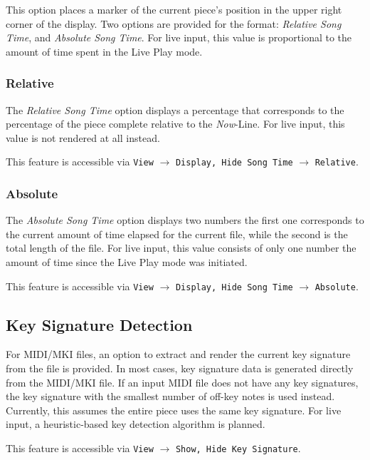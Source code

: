 \documentclass[english]{article}
\providecommand{\mi}[1]{\texttt{#1}}
\begin{document}
This option places a marker of the current piece's position in the upper right corner of the display.
Two options are provided for the format: \textit{Relative Song Time}, and \textit{Absolute Song Time}.
For live input, this value is proportional to the amount of time spent in the Live Play mode.

\subsubsection{Relative}

The \textit{Relative Song Time} option displays a percentage that corresponds to the percentage of the piece
complete relative to the \textit{Now}-Line. For live input, this value is not rendered at all instead.

This feature is accessible via 
\mi{View} $\rightarrow$ \mi{{Display, Hide} Song Time} $\rightarrow$ \mi{Relative}.

\subsubsection{Absolute}

The \textit{Absolute Song Time} option displays two numbers \textendash{} the first one corresponds to the 
current amount of time elapsed for the current file, while the second is the total length of the file.
For live input, this value consists of only one number \textendash{}
the amount of time since the Live Play mode was initiated.

This feature is accessible via 
\mi{View} $\rightarrow$ \mi{{Display, Hide} Song Time} $\rightarrow$ \mi{Absolute}.

\subsection{Key Signature Detection}

For MIDI/MKI files, an option to extract and render the current key signature from the file is provided. In most cases,
key signature data is generated directly from the MIDI/MKI file.
If an input MIDI file does not have any key signatures, the key signature with the smallest number of off-key notes
is used instead. Currently, this assumes the entire piece uses the same key signature. 
For live input, a heuristic-based key detection algorithm is planned.

This feature is accessible via 
\mi{View} $\rightarrow$ \mi{{Show, Hide} Key Signature}.
\end{document}
